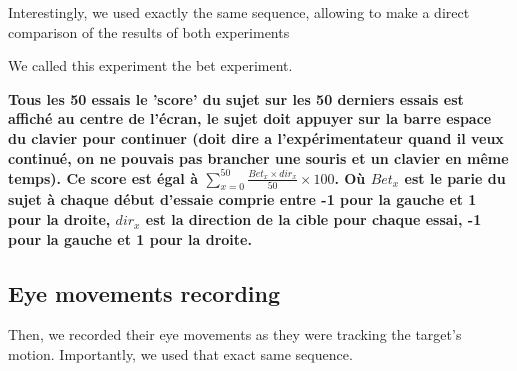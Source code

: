 \documentclass[profile,final,english, draft]{article}%
\begin{document}
Interestingly, we used exactly the same sequence, allowing to make a direct comparison of the results of both experiments

We called this experiment the bet experiment.


\textbf{Tous les 50 essais le 'score' du sujet sur les 50 derniers essais est affiché au centre de l'écran, le sujet doit appuyer sur la barre espace du clavier pour continuer (doit dire a l'expérimentateur quand il veux continué, on ne pouvais pas brancher une souris et un clavier en même temps). Ce score est égal à $\sum_{x=0}^{50} \frac{Bet_{x} \times dir_x}{50} \times 100$. Où $Bet_x$ est le parie du sujet à chaque début d'essaie comprie entre -1 pour la gauche et 1 pour la droite, $dir_x$ est la direction de la cible pour chaque essai, -1 pour la gauche et 1 pour la droite.}




\subsection{Eye movements recording}
Then, we recorded their eye movements as they were tracking the target's motion. Importantly, we used that exact same sequence.

\end{document}
